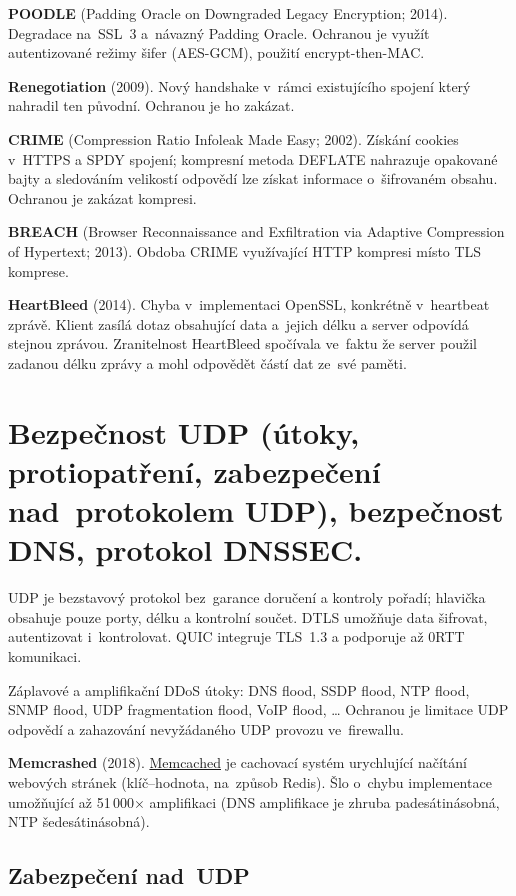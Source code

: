 \textbf{POODLE} (Padding Oracle on Downgraded Legacy Encryption; 2014).
Degradace na~SSL~3 a~návazný Padding Oracle.
Ochranou je využít autentizované režimy šifer (AES-GCM), použití encrypt-then-MAC.

\textbf{Renegotiation} (2009).
Nový handshake v~rámci existujícího spojení který nahradil ten původní.
Ochranou je ho zakázat.

\textbf{CRIME} (Compression Ratio Infoleak Made Easy; 2002).
Získání cookies v~HTTPS a SPDY spojení; kompresní metoda DEFLATE nahrazuje opakované bajty a sledováním velikostí odpovědí lze získat informace o~šifrovaném obsahu.
Ochranou je zakázat kompresi.

\textbf{BREACH} (Browser Reconnaissance and Exfiltration via Adaptive Compression of Hypertext; 2013).
Obdoba CRIME využívající HTTP kompresi místo TLS komprese.

\textbf{HeartBleed} (2014).
Chyba v~implementaci OpenSSL, konkrétně v~heartbeat zprávě.
Klient zasílá dotaz obsahující data a~jejich délku a server odpovídá stejnou zprávou.
Zranitelnost HeartBleed spočívala ve~faktu že server použil zadanou délku zprávy a mohl odpovědět částí dat ze~své paměti.


\clearpage
\section{Bezpečnost UDP (útoky, protiopatření, zabezpečení nad~protokolem UDP), bezpečnost DNS, protokol DNSSEC.}

UDP je bezstavový protokol bez~garance doručení a kontroly pořadí; hlavička obsahuje pouze porty, délku a kontrolní součet.
DTLS umožňuje data šifrovat, autentizovat i~kontrolovat.
QUIC integruje TLS~1.3 a podporuje až 0RTT komunikaci.

Záplavové a amplifikační DDoS útoky:
DNS flood, SSDP flood, NTP flood, SNMP flood, UDP fragmentation flood, VoIP flood, \dots
Ochranou je limitace UDP odpovědí a zahazování nevyžádaného UDP provozu ve~firewallu.

\textbf{Memcrashed} (2018).
\href{https://memcached.org}{Memcached} je cachovací systém urychlující načítání webových stránek (klíč--hodnota, na~způsob Redis).
Šlo o~chybu implementace umožňující až 51\,000$\times$ amplifikaci (DNS amplifikace je zhruba padesátinásobná, NTP šedesátinásobná).


\subsection{Zabezpečení nad~UDP}

